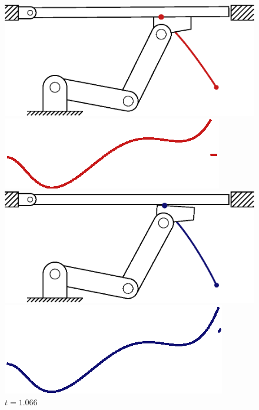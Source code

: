 \documentclass[../DC2019003Bouma.tex]{subfiles}
\begin{document}
\begin{figure}[bt!]
\begin{minipage}[c]{.3\textwidth}
\centering
    \includegraphics[width=\textwidth]{reference/frame32.eps}
	\begin{flushleft}
    \includegraphics[scale=0.55]{reference/refsnap_t103.eps}
	\end{flushleft}
    \includegraphics[width=\textwidth]{tracking/frame32.eps}
	\begin{flushleft}
    \includegraphics[scale=0.55]{tracking/trcsnap_t105.eps}
	\end{flushleft}
	\caption*{$t=1.066$}
\end{minipage}
\begin{minipage}[c]{.3\textwidth}

\end{minipage}
\end{figure}
\end{document}
